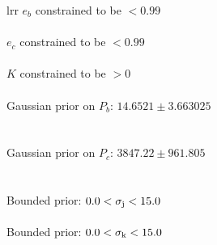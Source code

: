 \documentclass{emulateapj}
\begin{document}
\begin{deluxetable}{lrr}
\tablehead{}
\startdata
$e_{b}$ constrained to be $<0.99$ \\\\
$e_{c}$ constrained to be $<0.99$ \\\\
$K$ constrained to be $>0$\\\\
Gaussian prior on $P_{b}$: $14.6521 \pm 3.663025$ \\\\\\
Gaussian prior on $P_{c}$: $3847.22 \pm 961.805$ \\\\\\
Bounded prior: $0.0 < \sigma_{\rm j} < 15.0$\\\\
Bounded prior: $0.0 < \sigma_{\rm k} < 15.0$\\\\

\enddata
\end{deluxetable}
\end{document}
